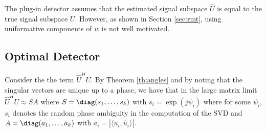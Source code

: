 The plug-in detector assumes that the estimated signal subspace $\widehat{U}$ is equal to the true signal subspace $U$. However, as shown in Section \ref{sec:rmt}, using uniformative components of $w$ is not well motivated.

\subsection{Optimal Detector}\label{subsec:optdet}

Consider the the term $\widehat{U}^HU$. By Theorem \ref{th:angles} and by noting that the singular vectors are unique up to a phase, we have that in the large matrix limit $\widehat{U}^HU \approx SA$ where $S=\diag(s_1,\dots,s_{k})$ with $s_i=\exp(j \psi_i)$ where for some $\psi_{i}$, $s_i$ denotes the random phase ambiguity in the computation of the SVD and $A=\diag(a_1,\dots,a_k)$ with $a_i=|\langle u_i,\widehat{u}_i\rangle|$.

